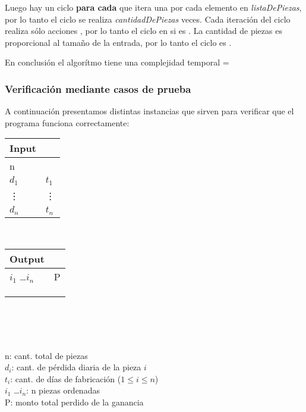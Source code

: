 \documentclass[11pt, a4paper, twoside]{article}
\begin{document}
  Luego hay un ciclo \textbf{para cada} que itera una por cada elemento en \textit{listaDePiezas},
por lo tanto el ciclo se realiza \textit{cantidadDePiezas} veces. Cada iteración del ciclo realiza
sólo acciones , por lo tanto el ciclo en si es . La cantidad de piezas
es proporcional al tamaño de la entrada, por lo tanto el ciclo es .

  En conclusión el algorítmo tiene una complejidad temporal =

  




\subsubsection{Verificación mediante casos de prueba}

A continuación presentamos distintas instancias que sirven para verificar que el programa funciona correctamente: \\ 

\begin{minipage}{0.2\textwidth}
	\begin{tabular}{ll}
		Input  \\
		\hline
		n &  \\
		$d_1$ & $t_1$ \\
		\vdots & \vdots \\
		$d_n$ & $t_n$ 
	\end{tabular} \\ 
\end{minipage}
\begin{minipage}{0.2\textwidth}
	\begin{tabular}{ll}
		Output  \\
		\hline
		$i_1$ \dots $i_n$ & P \\
		 \\
		 \\
		 \\
	\end{tabular} \\ 
\end{minipage}  \\
\\
n: cant. total de piezas  \\
$d_i$: cant. de pérdida diaria de la pieza $i$ \\
$t_i$: cant. de días de fabricación ($1 \le i \le n$) \\
$i_1$ \dots $i_n$: n piezas ordenadas \\
P: monto total perdido de la ganancia \\
\end{document}

